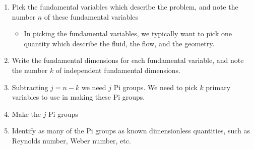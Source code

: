 \begin{enumerate}
  \item{Pick the fundamental variables which describe the problem, and note the number $n$ of these fundamental variables}
  \begin{itemize}
    \item{In picking the fundamental variables, we typically want to pick one quantity which describe the fluid, the flow, and the geometry.}
  \end{itemize}
  \item{Write the fundamental dimensions for each fundamental variable, and note the number $k$ of independent fundamental dimensions.}
  \item{%
    Subtracting $j=n-k$ we need $j$ Pi groups.
    We need to pick $k$ primary variables to use in making these Pi groups.
  }
  \item{Make the $j$ Pi groups}
  \item{Identify as many of the Pi groups as known dimensionless quantities, such as Reynolds number, Weber number, etc.}
\end{enumerate}

